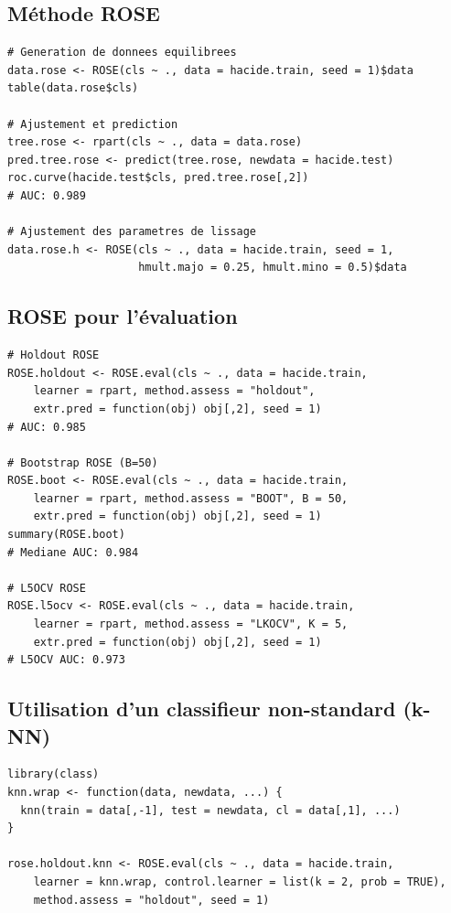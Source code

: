\documentclass[a4paper,11pt]{article}
\theoremstyle{definition}
\begin{document}
\subsection{M\'ethode ROSE}

\begin{lstlisting}
# Generation de donnees equilibrees
data.rose <- ROSE(cls ~ ., data = hacide.train, seed = 1)$data
table(data.rose$cls)

# Ajustement et prediction
tree.rose <- rpart(cls ~ ., data = data.rose)
pred.tree.rose <- predict(tree.rose, newdata = hacide.test)
roc.curve(hacide.test$cls, pred.tree.rose[,2])
# AUC: 0.989

# Ajustement des parametres de lissage
data.rose.h <- ROSE(cls ~ ., data = hacide.train, seed = 1,
                    hmult.majo = 0.25, hmult.mino = 0.5)$data
\end{lstlisting}

\subsection{ROSE pour l'\'evaluation}

\begin{lstlisting}
# Holdout ROSE
ROSE.holdout <- ROSE.eval(cls ~ ., data = hacide.train,
    learner = rpart, method.assess = "holdout",
    extr.pred = function(obj) obj[,2], seed = 1)
# AUC: 0.985

# Bootstrap ROSE (B=50)
ROSE.boot <- ROSE.eval(cls ~ ., data = hacide.train,
    learner = rpart, method.assess = "BOOT", B = 50,
    extr.pred = function(obj) obj[,2], seed = 1)
summary(ROSE.boot)
# Mediane AUC: 0.984

# L5OCV ROSE
ROSE.l5ocv <- ROSE.eval(cls ~ ., data = hacide.train,
    learner = rpart, method.assess = "LKOCV", K = 5,
    extr.pred = function(obj) obj[,2], seed = 1)
# L5OCV AUC: 0.973
\end{lstlisting}

\subsection{Utilisation d'un classifieur non-standard (k-NN)}

\begin{lstlisting}
library(class)
knn.wrap <- function(data, newdata, ...) {
  knn(train = data[,-1], test = newdata, cl = data[,1], ...)
}

rose.holdout.knn <- ROSE.eval(cls ~ ., data = hacide.train,
    learner = knn.wrap, control.learner = list(k = 2, prob = TRUE),
    method.assess = "holdout", seed = 1)
\end{lstlisting}
\end{document}
